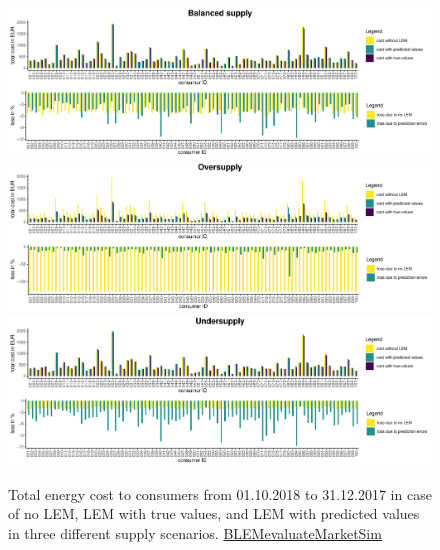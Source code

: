 \begin{figure}[htbp]
    \centering
    \includegraphics[width=\textwidth]{thesis/graphs/marketsimulation/totalenergycost_balanced.pdf}\\\vspace{.6cm}
    \includegraphics[width=\textwidth]{thesis/graphs/marketsimulation/totalenergycost_oversupply.pdf}\\\vspace{.6cm}
    \includegraphics[width=\textwidth]{thesis/graphs/marketsimulation/totalenergycost_undersupply.pdf}
    \caption[Total energy cost to consumers in different supply scenarios]{Total energy cost to consumers from 01.10.2018 to 31.12.2017 in case of no LEM, LEM with true values, and LEM with predicted values in three different supply scenarios. \quantnet\href{https://github.com/QuantLet/BLEM/tree/master/BLEMevaluateMarketSim}{BLEMevaluateMarketSim}}
    \label{Fig:total_energycost}
\end{figure}
%

